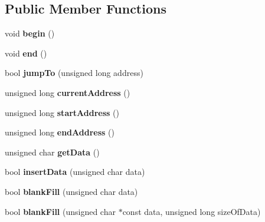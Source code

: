 \subsection*{Public Member Functions}
\begin{DoxyCompactItemize}
\item 
\hypertarget{classintelhex_ab2b1119e14a960ea2b356967244aafb3}{
void {\bfseries begin} ()}
\label{classintelhex_ab2b1119e14a960ea2b356967244aafb3}

\item 
\hypertarget{classintelhex_a7759926596cfcffec94e391fff4298e9}{
void {\bfseries end} ()}
\label{classintelhex_a7759926596cfcffec94e391fff4298e9}

\item 
\hypertarget{classintelhex_a83b54457c121b0f35b21b78fa2ecd712}{
bool {\bfseries jumpTo} (unsigned long address)}
\label{classintelhex_a83b54457c121b0f35b21b78fa2ecd712}

\item 
\hypertarget{classintelhex_a631d8930daeaf04bf0d9ad9c25679a0b}{
unsigned long {\bfseries currentAddress} ()}
\label{classintelhex_a631d8930daeaf04bf0d9ad9c25679a0b}

\item 
\hypertarget{classintelhex_ab78b6ecc1fd3889bfb0c3bb57f028a64}{
unsigned long {\bfseries startAddress} ()}
\label{classintelhex_ab78b6ecc1fd3889bfb0c3bb57f028a64}

\item 
\hypertarget{classintelhex_af7692acb24330da3debf8c7fb21ab056}{
unsigned long {\bfseries endAddress} ()}
\label{classintelhex_af7692acb24330da3debf8c7fb21ab056}

\item 
\hypertarget{classintelhex_a00e0fd557bec34d0bb11ef92530121a0}{
unsigned char {\bfseries getData} ()}
\label{classintelhex_a00e0fd557bec34d0bb11ef92530121a0}

\item 
\hypertarget{classintelhex_a71096983db3c24a5ac9b95663937a4ce}{
bool {\bfseries insertData} (unsigned char data)}
\label{classintelhex_a71096983db3c24a5ac9b95663937a4ce}

\item 
\hypertarget{classintelhex_a5de5cf10103fc307127f9017f3e5cd76}{
bool {\bfseries blankFill} (unsigned char data)}
\label{classintelhex_a5de5cf10103fc307127f9017f3e5cd76}

\item 
\hypertarget{classintelhex_a84bbd449bb55e218b62ea73e2b399196}{
bool {\bfseries blankFill} (unsigned char $\ast$const data, unsigned long sizeOfData)}
\label{classintelhex_a84bbd449bb55e218b62ea73e2b399196}


\end{DoxyCompactItemize}
